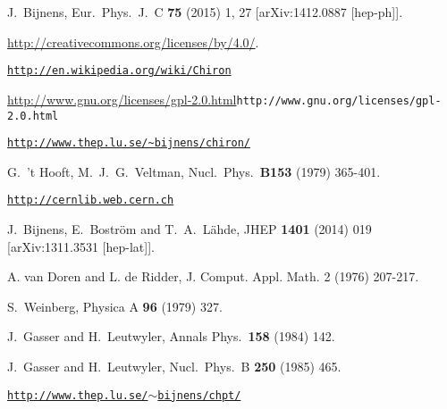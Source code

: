 \documentclass[12pt,a4paper]{article}
\begin{document}
\begin{thebibliography}{99}
{}

 J.~Bijnens,
  Eur.\ Phys.\ J.\ C {\bf 75} (2015) 1,  27
  [arXiv:1412.0887 [hep-ph]].

 \url{http://creativecommons.org/licenses/by/4.0/}.


 \href{http://en.wikipedia.org/wiki/Chiron}{\tt http://en.wikipedia.org/wiki/Chiron}

 \url{http://www.gnu.org/licenses/gpl-2.0.html}{\tt http://www.gnu.org/licenses/gpl-2.0.html}

 \href{http://www.thep.lu.se/\%7Ebijnens/chiron/}{\tt http://www.thep.lu.se/\textasciitilde{}bijnens/chiron/}

  G.~'t Hooft, M.~J.~G.~Veltman,
  Nucl.\ Phys.\  {\bf B153 } (1979)  365-401.

 \href{http://cernlib.web.cern.ch}{\tt http://cernlib.web.cern.ch}

  J.~Bijnens, E.~Bostr\"om and T.~A.~L\"ahde,
  JHEP {\bf 1401} (2014) 019
  [arXiv:1311.3531 [hep-lat]].

A. van Doren and L. de Ridder, 
J. Comput. Appl. Math. 2 (1976) 207-217. 

  S.~Weinberg,
  Physica A {\bf 96} (1979) 327.

  J.~Gasser and H.~Leutwyler,
  Annals Phys.\  {\bf 158} (1984) 142.

  J.~Gasser and H.~Leutwyler,
  Nucl.\ Phys.\ B {\bf 250} (1985) 465.

 \href{http://www.thep.lu.se/~bijnens/chpt/}{\tt http://www.thep.lu.se/$\sim$bijnens/chpt/}


\end{thebibliography}
\end{document}
